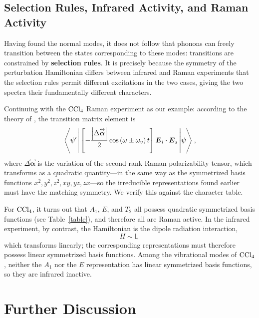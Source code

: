\documentclass[lang=en, column=onecolumn, mathfont=times]{spArticle}
\begin{document}
\subsection{Selection Rules, Infrared Activity, and Raman Activity}

Having found the normal modes, it does not follow that phonons can freely transition between the states corresponding to these modes: transitions are constrained by \textbf{selection rules}. It is precisely because the symmetry of the perturbation Hamiltonian differs between infrared and Raman experiments that the selection rules permit different excitations in the two cases, giving the two spectra their fundamentally different characters.

Continuing with the $\ce{CCl4}$ Raman experiment as our example: according to the theory of \textcite{Placzek1934Handbuch}, the transition matrix element is
\begin{equation}
    \left<\vphantom{\left[ -\frac{\left| \Delta \overset{\leftrightarrow}{\boldsymbol{\alpha}} \right|}{2}\cos \left( \omega \pm \omega _v \right) t \right] } \psi ^{\prime} \right|\left[ -\frac{\left| \Delta \overset{\leftrightarrow}{\boldsymbol{\alpha}} \right|}{2}\cos \left( \omega \pm \omega _v \right) t \right] \boldsymbol{E}_i\cdot \boldsymbol{E}_s\left| \psi \vphantom{\left[ -\frac{\left| \Delta \overset{\leftrightarrow}{\boldsymbol{\alpha}} \right|}{2}\cos \left( \omega \pm \omega _v \right) t \right] }\right>, 
\end{equation}
where $\Delta \overset{\leftrightarrow}{\boldsymbol{\alpha}}$ is the variation of the second-rank Raman polarizability tensor, which transforms as a quadratic quantity---in the same way as the symmetrized basis functions $x^2, y^2, z^2, xy, yz, zx$---so the irreducible representations found earlier must have the matching symmetry. We verify this against the character table.
    
For $\ce{CCl4}$, it turns out that $A_1$, $E$, and $T_2$ all possess quadratic symmetrized basis functions (see Table~\ref{table}), and therefore all are Raman active. In the infrared experiment, by contrast, the Hamiltonian is the dipole radiation interaction,
$$
H\sim \boldsymbol{l}, 
$$
which transforms linearly; the corresponding representations must therefore possess linear symmetrized basis functions. Among the vibrational modes of $\ce{CCl4}$, neither the $A_1$ nor the $E$ representation has linear symmetrized basis functions, so they are infrared inactive.

\section{Further Discussion}
\end{document}
